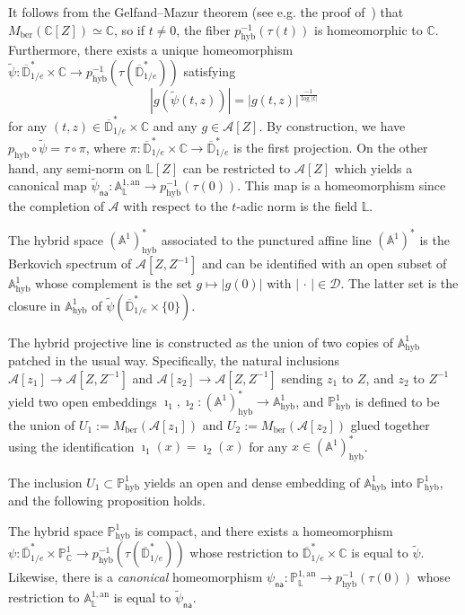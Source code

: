 \documentclass[AHL,Unicode,longabstracts]{cedram}
\DeclareMathOperator{\hyb}{hyb}
\newcommand{\cc}{\mathbb{C}}
\newcommand{\phyb}{{\mathbb{P}^1_{\mathrm{hyb}}}}
\newcommand{\cA}{\mathcal{A}}
\newcommand{\cD}{\mathcal{D}}
\newcommand{\A}{{\mathbb A}}
\newcommand{\D}{\mathbb{D}}
\newcommand{\an}{\mathrm{an}}
\newcommand{\PP}{\mathbb{P}}
\newcommand{\Laurent}{\mathbb{L}}
\newcommand{\lrpar}[1]{\left(#1\right)}
\newcommand{\na}{\mathsf{na}}
\newcommand{\inv}{^{-1}}
\begin{document}
It follows from the Gelfand--Mazur theorem (see e.g. the proof of~\cite[Prop.~1.1]{degeneration}) that $M_{\mathrm{ber}}(\cc[Z]) \simeq \cc$, so if $t\neq 0$, the fiber $p_{\hyb}\inv(\tau(t))$ is homeomorphic to $\cc$. Furthermore, there exists a unique homeomorphism $\widetilde \psi: \overline{\D}^*_{1/e} \times \cc \to p_{\hyb}^{-1}(\tau (\overline{\D}^*_{1/e})) $ satisfying
\begin{equation}\label{eq:identify}
|g(\widetilde\psi(t,z))| = |g(t,z)|^{\frac{-1}{\log \mathopen| t \mathclose|}}
\end{equation}
for any $(t,z) \in \overline{\D}^*_{1/e} \times \cc $ and any $g\in \cA[Z]$. By construction, we have $ p_{\hyb} \circ \widetilde\psi=\tau \circ \pi$, where $\pi: \overline{\D}^*_{1/e} \times \cc \to\overline{\D}^*_{1/e} $ is the first projection. On the other hand, any semi-norm on $\Laurent[Z]$ can be restricted to $\cA[Z]$ which yields a canonical map $\widetilde\psi_{\na}: \A^{1,\an}_{\Laurent} \to p_{\hyb}\inv(\tau(0))$. This map is a homeomorphism since the completion of $\cA$ with respect to the $t$-adic norm is the field $\Laurent$.


The hybrid space $(\A^1)^*_{\hyb}$ associated to the punctured affine line $(\A^1)^*$ is the Berkovich spectrum of $\cA[Z,Z^{-1}]$ and can be identified with an open subset of $\A^1_{\hyb}$ whose complement is the set $ g \mapsto |g(0)|$ with $|{\,\cdot\,}| \in \cD$. The latter set is the closure in $\A^1_{\hyb}$ of $\widetilde{\psi}\lrpar{\overline{\D}^*_{1/e} \times \{0\} }$.


The hybrid projective line is constructed as the union of two copies of $\A^1_{\hyb}$ patched in the usual way. Specifically, the natural inclusions $ \cA[z_1] \to \cA[Z,Z^{-1}]$ and $\cA[z_2] \to \cA[Z,Z^{-1}]$ sending $z_1$ to $Z$, and $z_2$ to $Z^{-1}$ yield two open embeddings $\imath_1, \imath_2\colon(\A^1)^*_{\hyb} \to \A^1_{\hyb}$, and $\phyb$ is defined to be the union of $U_1:=M_{\mathrm{ber}}(\cA[z_1])$ and $U_2 :=M_{\mathrm{ber}}(\cA[z_2])$ glued together using the identification $\imath_1(x) = \imath_2(x)$ for any $x\in (\A^1)^*_{\hyb}$.

The inclusion $U_1 \subset \PP^1_{\hyb}$ yields an open and dense embedding of $\A^1_{\hyb}$ into $\PP^1_{\hyb}$, and the following proposition holds.
\begin{prop}
The hybrid space $\PP^1_{\hyb}$ is compact, and there exists a homeomorphism $\psi: \overline{\D}^*_{1/e} \times \PP^1_\cc \to p_{\hyb}^{-1}(\tau (\overline{\D}^*_{1/e})) $ whose restriction to $\overline{\D}^*_{1/e} \times \cc $ is equal to $\widetilde \psi $. Likewise, there is a \emph{canonical} homeomorphism $\psi_\na: \PP^{1,\an}_{\Laurent} \to p_{\hyb}\inv(\tau(0))$ whose restriction to $\A^{1,\an}_{\Laurent}$ is equal to $\widetilde \psi_{\na}$.
\end{prop}
\end{document}
